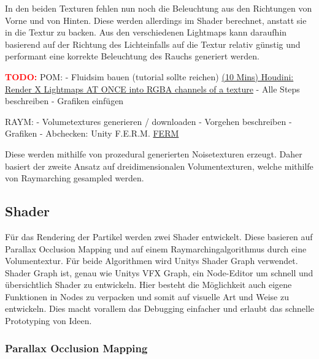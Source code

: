 In den beiden Texturen fehlen nun noch die Beleuchtung aus den Richtungen von Vorne und von Hinten. Diese werden allerdings im Shader
berechnet, anstatt sie in die Textur zu backen. Aus den verschiedenen Lightmaps kann daraufhin basierend auf der Richtung des Lichteinfalls
auf die Textur relativ günstig und performant eine korrekte Beleuchtung des Rauchs generiert werden.

\newpage
\textcolor{red}{\textbf{TODO:}} \newline
POM: \newline
- Fluidsim bauen (tutorial sollte reichen) \href{https://www.youtube.com/watch?v=6bACPGpfItU&t=20s}{(10 Mins) Houdini: Render X Lightmaps AT ONCE into RGBA channels of a texture}\newline
- Alle Steps beschreiben\newline
- Grafiken einfügen\newline

RAYM: \newline
- Volumetextures generieren / downloaden\newline
- Vorgehen beschreiben\newline
- Grafiken \newline
- Abchecken: Unity F.E.R.M. \href{https://forum.unity.com/threads/released-f-e-r-m-toolkit-fast-easy-raymarching-in-unity.655960/}{FERM}\newline


Diese werden mithilfe von prozedural generierten Noisetexturen erzeugt.
Daher basiert der zweite Ansatz auf dreidimensionalen Volumentexturen, welche mithilfe von Raymarching gesampled werden.


\subsection{Shader}
Für das Rendering der Partikel werden zwei Shader entwickelt. Diese basieren auf Parallax Occlusion Mapping und auf einem Raymarchingalgorithmus
durch eine Volumentextur. Für beide Algorithmen wird Unitys Shader Graph verwendet. Shader Graph ist, genau wie Unitys VFX Graph, ein Node-Editor um
schnell und übersichtlich Shader zu entwickeln. Hier besteht die Möglichkeit auch eigene Funktionen in Nodes zu verpacken und somit auf visuelle Art und Weise zu entwickeln.
Dies macht vorallem das Debugging einfacher und erlaubt das schnelle Prototyping von Ideen.


\subsubsection{Parallax Occlusion Mapping}


